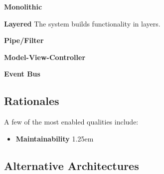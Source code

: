 \documentclass{article}
\newcommand{\indentsize}{1.25em}
\newcommand{\pbodyitem}[2]{
    \item \textbf{{#1}} {
    \parindent \indentsize \newline {#2}
}
}
\begin{document}
\textbf{Monolithic}

\textbf{Layered}
The system builds functionality in layers.


\textbf{Pipe/Filter}


\textbf{Model-View-Controller}


\textbf{Event Bus}


\subsection{Rationales}
A few of the most enabled qualities include:

\begin{itemize}
  \pbodyitem{Maintainability}{}
\end{itemize}

\subsection{Alternative Architectures}
\end{document}

